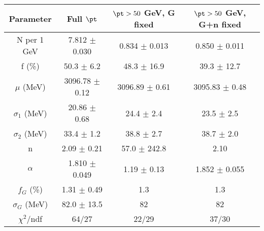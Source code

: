 \begin{tabular}{c||c|c|c}
Parameter & Full $\pt$ & $\pt>50$ GeV, G fixed & $\pt>50$ GeV, G+n fixed \\
\hline
N per 1 GeV & 7.812 $\pm$ 0.030 & 0.834 $\pm$ 0.013 & 0.850 $\pm$ 0.011\\
f (\%) & 50.3 $\pm$ 6.2 & 48.3 $\pm$ 16.9 & 39.3 $\pm$ 12.7\\
$\mu$ (MeV) & 3096.78 $\pm$ 0.12 & 3096.89 $\pm$ 0.61 & 3095.83 $\pm$ 0.48\\
$\sigma_1$ (MeV) & 20.86 $\pm$ 0.68 & 24.4 $\pm$ 2.4 & 23.5 $\pm$ 2.5\\
$\sigma_2$ (MeV) & 33.4 $\pm$ 1.2 & 38.8 $\pm$ 2.7 & 38.7 $\pm$ 2.0\\
n & 2.09 $\pm$ 0.21 & 57.0 $\pm$ 242.8 & 2.10\\
$\alpha$ & 1.810 $\pm$ 0.049 & 1.19 $\pm$ 0.13 & 1.852 $\pm$ 0.055\\
$f_G$ (\%) & 1.31 $\pm$ 0.49 & 1.3 & 1.3\\
$\sigma_G$ (MeV) & 82.0 $\pm$ 13.5 & 82 & 82\\
\hline
$\chi^2$/ndf & 64/27 & 22/29 & 37/30\\
\end{tabular}
